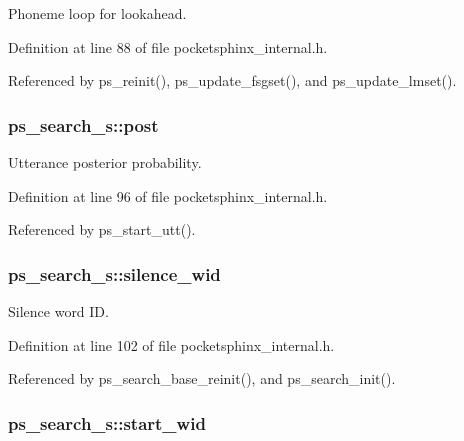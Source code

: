 \-Phoneme loop for lookahead. 



\-Definition at line 88 of file pocketsphinx\-\_\-internal.\-h.



\-Referenced by ps\-\_\-reinit(), ps\-\_\-update\-\_\-fsgset(), and ps\-\_\-update\-\_\-lmset().

\subsubsection[{post}]{ {\bf ps\-\_\-search\-\_\-s\-::post}}\label{structps__search__s_a721a656d0e34f7604ea8c52a1bdf14ff}


\-Utterance posterior probability. 



\-Definition at line 96 of file pocketsphinx\-\_\-internal.\-h.



\-Referenced by ps\-\_\-start\-\_\-utt().

\subsubsection[{silence\-\_\-wid}]{ {\bf ps\-\_\-search\-\_\-s\-::silence\-\_\-wid}}\label{structps__search__s_ab6851b4675f38ab6b3683d75521f000b}


\-Silence word \-I\-D. 



\-Definition at line 102 of file pocketsphinx\-\_\-internal.\-h.



\-Referenced by ps\-\_\-search\-\_\-base\-\_\-reinit(), and ps\-\_\-search\-\_\-init().

\subsubsection[{start\-\_\-wid}]{ {\bf ps\-\_\-search\-\_\-s\-::start\-\_\-wid}}\label{structps__search__s_ae1a9fa33bfc851ec91ce96870714b3cc}


